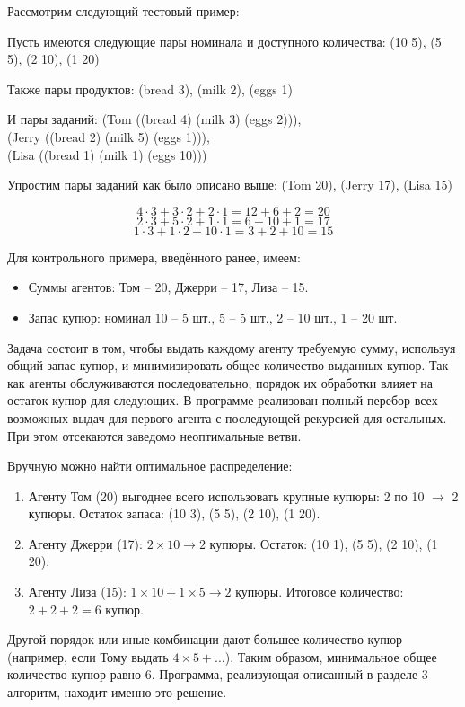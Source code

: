 \documentclass[12pt]{extarticle}
\begin{document}
Рассмотрим следующий тестовый пример:

Пусть имеются следующие пары номинала и доступного количества:
(10 5), (5 5), (2 10), (1 20)

Также пары продуктов: (bread 3), (milk 2), (eggs 1)

И пары заданий:
(Tom ((bread 4) (milk 3) (eggs 2))), \\
(Jerry ((bread 2) (milk 5) (eggs 1))), \\
(Lisa ((bread 1) (milk 1) (eggs 10)))

Упростим пары заданий как было описано выше:
(Tom 20), (Jerry 17), (Lisa 15)

\[4\cdot3 + 3\cdot2 + 2\cdot1 = 12+6+2 = 20\]
\[2\cdot3 + 5\cdot2 + 1\cdot1 = 6+10+1 = 17\]
\[1\cdot3 + 1\cdot2 + 10\cdot1 = 3+2+10 = 15\]

Для контрольного примера, введённого ранее, имеем:

\begin{itemize}
  \item Суммы агентов: Том – 20, Джерри – 17, Лиза – 15.
  \item Запас купюр: номинал 10 – 5 шт., 5 – 5 шт., 2 – 10 шт., 1 – 20 шт.
\end{itemize}

Задача состоит в том, чтобы выдать каждому агенту требуемую сумму, используя общий запас купюр, и минимизировать общее количество выданных купюр. Так как агенты обслуживаются последовательно, порядок их обработки влияет на остаток купюр для следующих. В программе реализован полный перебор всех возможных выдач для первого агента с последующей рекурсией для остальных. При этом отсекаются заведомо неоптимальные ветви.

Вручную можно найти оптимальное распределение:

\begin{enumerate}
  \item Агенту Том (20) выгоднее всего использовать крупные купюры: 2 по 10 $\rightarrow$ 2 купюры. Остаток запаса: (10 3), (5 5), (2 10), (1 20).
  \item Агенту Джерри (17): $2 \times 10 \rightarrow 2$ купюры. Остаток: (10 1), (5 5), (2 10), (1 20).
  \item Агенту Лиза (15): $1 \times 10 + 1 \times 5 \rightarrow 2$ купюры. Итоговое количество: $2+2+2 = 6$ купюр.
\end{enumerate}

Другой порядок или иные комбинации дают большее количество купюр (например, если Тому выдать $4 \times 5 + \dots$). Таким образом, минимальное общее количество купюр равно 6. Программа, реализующая описанный в разделе 3 алгоритм, находит именно это решение.
\end{document}
